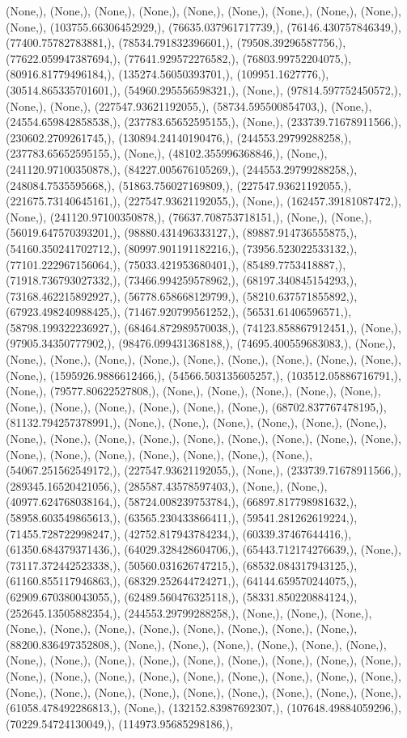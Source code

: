 \documentclass{article}
\begin{document}
(None,), (None,), (None,), (None,), (None,), (None,), (None,), (None,), (None,), (None,), (103755.66306452929,), (76635.037961717739,), (76146.430757846349,), (77400.75782783881,), (78534.791832396601,), (79508.39296587756,), (77622.059947387694,), (77641.929572276582,), (76803.99752204075,), (80916.81779496184,), (135274.56050393701,), (109951.1627776,), (30514.865335701601,), (54960.295556598321,), (None,), (97814.597752450572,), (None,), (None,), (227547.93621192055,), (58734.595500854703,), (None,), (24554.659842858538,), (237783.65652595155,), (None,), (233739.71678911566,), (230602.2709261745,), (130894.24140190476,), (244553.29799288258,), (237783.65652595155,), (None,), (48102.355996368846,), (None,), (241120.97100350878,), (84227.005676105269,), (244553.29799288258,), (248084.7535595668,), (51863.756027169809,), (227547.93621192055,), (221675.73140645161,), (227547.93621192055,), (None,), (162457.39181087472,), (None,), (241120.97100350878,), (76637.708753718151,), (None,), (None,), (56019.647570393201,), (98880.431496333127,), (89887.914736555875,), (54160.350241702712,), (80997.901191182216,), (73956.523022533132,), (77101.222967156064,), (75033.421953680401,), (85489.7753418887,), (71918.736793027332,), (73466.994259578962,), (68197.340845154293,), (73168.462215892927,), (56778.658668129799,), (58210.637571855892,), (67923.498240988425,), (71467.920799561252,), (56531.61406596571,), (58798.199322236927,), (68464.872989570038,), (74123.858867912451,), (None,), (97905.34350777902,), (98476.099431368188,), (74695.400559683083,), (None,), (None,), (None,), (None,), (None,), (None,), (None,), (None,), (None,), (None,), (None,), (1595926.9886612466,), (54566.503135605257,), (103512.05886716791,), (None,), (79577.80622527808,), (None,), (None,), (None,), (None,), (None,), (None,), (None,), (None,), (None,), (None,), (None,), (68702.837767478195,), (81132.794257378991,), (None,), (None,), (None,), (None,), (None,), (None,), (None,), (None,), (None,), (None,), (None,), (None,), (None,), (None,), (None,), (None,), (None,), (None,), (None,), (None,), (None,), (None,), (54067.251562549172,), (227547.93621192055,), (None,), (233739.71678911566,), (289345.16520421056,), (285587.43578597403,), (None,), (None,), (40977.624768038164,), (58724.008239753784,), (66897.817798981632,), (58958.603549865613,), (63565.230433866411,), (59541.281262619224,), (71455.728722998247,), (42752.817943784234,), (60339.37467644416,), (61350.684379371436,), (64029.328428604706,), (65443.712174276639,), (None,), (73117.372442523338,), (50560.031626747215,), (68532.084317943125,), (61160.855117946863,), (68329.252644724271,), (64144.659570244075,), (62909.670380043055,), (62489.560476325118,), (58331.850220884124,), (252645.13505882354,), (244553.29799288258,), (None,), (None,), (None,), (None,), (None,), (None,), (None,), (None,), (None,), (None,), (None,), (88200.836497352808,), (None,), (None,), (None,), (None,), (None,), (None,), (None,), (None,), (None,), (None,), (None,), (None,), (None,), (None,), (None,), (None,), (None,), (None,), (None,), (None,), (None,), (None,), (None,), (None,), (None,), (None,), (None,), (None,), (None,), (None,), (None,), (None,), (None,), (61058.478492286813,), (None,), (132152.83987692307,), (107648.49884059296,), (70229.54724130049,), (114973.95685298186,), 
\end{document}
